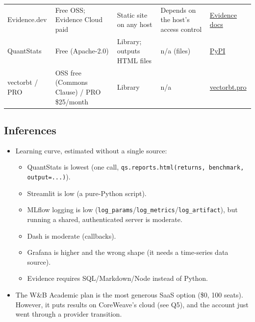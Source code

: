 \documentclass{article}
\begin{document}
\begin{center}
\begin{tabularx}{\linewidth}{>{\raggedright\arraybackslash}X >{\raggedright\arraybackslash}X >{\raggedright\arraybackslash}X >{\raggedright\arraybackslash}X >{\raggedright\arraybackslash}X}
Evidence.dev & Free OSS; Evidence Cloud paid & Static site on any host & Depends on the host's access control & \href{https://docs.evidence.dev/}{Evidence docs} \\
QuantStats & Free (Apache-2.0) & Library; outputs HTML files & n/\allowbreak{}a (files) & \href{https://pypi.org/project/quantstats/}{PyPI} \\
vectorbt /\allowbreak{} PRO & OSS free (Commons Clause) /\allowbreak{} PRO \$25/\allowbreak{}month & Library & n/\allowbreak{}a & \href{https://vectorbt.pro/}{vectorbt.pro} \\
\bottomrule
\end{tabularx}
\end{center}

\subsection{Inferences}

\begin{itemize}

\item Learning curve, estimated without a single source:

\begin{itemize}

\item QuantStats is lowest (one call, \texttt{qs.\allowbreak{}reports.\allowbreak{}html(returns,\allowbreak{} benchmark,\allowbreak{} output=.\allowbreak{}.\allowbreak{}.\allowbreak{})}).

\item Streamlit is low (a pure-Python script).

\item MLflow logging is low (\texttt{log\_\allowbreak{}params}/\allowbreak{}\texttt{log\_\allowbreak{}metrics}/\allowbreak{}\texttt{log\_\allowbreak{}artifact}), but running a shared, authenticated server is moderate.

\item Dash is moderate (callbacks).

\item Grafana is higher and the wrong shape (it needs a time-series data source).

\item Evidence requires SQL/\allowbreak{}Markdown/\allowbreak{}Node instead of Python.

\end{itemize}

\item The W\&B Academic plan is the most generous SaaS option (\$0, 100 seats). However, it puts results on CoreWeave's cloud (see Q5), and the account just went through a provider transition.

\end{itemize}
\end{document}
